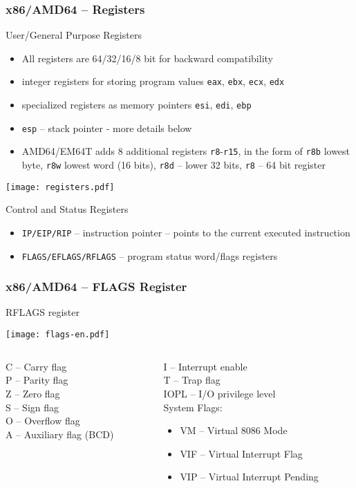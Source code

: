 \documentclass{beamer}
\begin{document}
\begin{frame}[shrink=1.2]
\frametitle{x86/AMD64 -- Registers}
\small
User/General Purpose Registers
\begin{itemize}
\item All registers are 64/32/16/8 bit for backward compatibility
\item integer registers for storing program values ​​\texttt{eax}, \texttt{ebx}, \texttt{ecx}, \texttt{edx}
\item specialized registers as memory pointers \texttt{esi}, \texttt{edi}, \texttt{ebp}
\item \texttt{esp} – stack pointer - more details below
\item AMD64/EM64T adds 8 additional registers \texttt{r8}-\texttt{r15}, in the form of \texttt{r8b} lowest byte, \texttt{r8w} lowest word (16 bits), \texttt{r8d} – lower 32 bits, \texttt{r8} – 64 bit register
\end{itemize}
\begin{center}
\texttt{[image: registers.pdf]}
\end{center}
Control and Status Registers
\begin{itemize}
\item \texttt{IP/EIP/RIP} – instruction pointer – points to the current executed instruction
\item \texttt{FLAGS/EFLAGS/RFLAGS} – program status word/flags registers
\end{itemize}

\end{frame}



\begin{frame}
\frametitle{x86/AMD64 -- FLAGS Register}
RFLAGS register
\begin{center}
\texttt{[image: flags-en.pdf]}
\end{center}
\begin{columns}[t,onlytextwidth]
\begin{column}{0.5\textwidth}
C -- Carry flag\\
P -- Parity flag\\
Z -- Zero flag\\
S -- Sign flag\\
O -- Overflow flag\\
A -- Auxiliary flag (BCD)
\end{column}
\begin{column}{0.5\textwidth}  
I -- Interrupt enable\\
T -- Trap flag\\
IOPL -- I/O privilege level\\
System Flags:
\begin{itemize}
\item VM -- Virtual 8086 Mode
\item VIF -- Virtual Interrupt Flag
\item VIP -- Virtual Interrupt Pending
\end{itemize}
\end{column}
\end{columns}
\end{frame}
\end{document}
